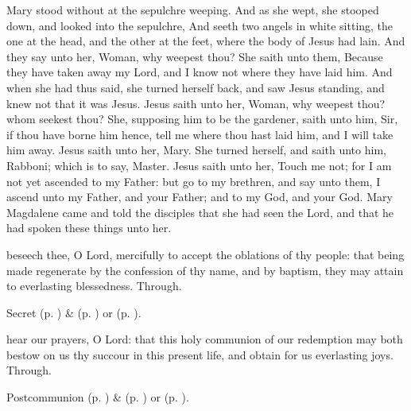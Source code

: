  Mary stood without at the sepulchre weeping. And as she wept, she stooped down, and looked into the sepulchre, And seeth two angels in white sitting, the one at the head, and the other at the feet, where the body of Jesus had lain. And they say unto her, Woman, why weepest thou? She saith unto them, Because they have taken away my Lord, and I know not where they have laid him. And when she had thus said, she turned herself back, and saw Jesus standing, and knew not that it was Jesus. Jesus saith unto her, Woman, why weepest thou? whom seekest thou? She, supposing him to be the gardener, saith unto him, Sir, if thou have borne him hence, tell me where thou hast laid him, and I will take him away. Jesus saith unto her, Mary. She turned herself, and saith unto him, Rabboni; which is to say, Master. Jesus saith unto her, Touch me not; for I am not yet ascended to my Father: but go to my brethren, and say unto them, I ascend unto my Father, and your Father; and to my God, and your God. Mary Magdalene came and told the disciples that she had seen the Lord, and that he had spoken these things unto her.


\clearpage
\secret
{} beseech thee, O Lord, mercifully to accept the oblations of thy people: that being made regenerate by the confession of thy name, and by baptism, they may attain to everlasting blessedness. Through.
\begin{rubric}
     Secret  (p. \pageref{EasterSecret}) \&   (p. \pageref{SPAgainst}) or  (p. \pageref{SPChiefBishop}).
\end{rubric}


\postcommunion
{} hear our prayers, O Lord: that this holy communion of our redemption may both bestow on us thy succour in this present life, and obtain for us everlasting joys. Through.
\begin{rubric}
     Postcommunion  (p. \pageref{EasterPostcommunion}) \&   (p. \pageref{SPAgainst}) or  (p. \pageref{SPChiefBishop}).
\end{rubric}


